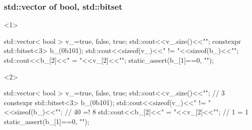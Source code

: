 \documentclass[aspectratio=43]{beamer}
\begin{document}
\begin{frame}[fragile]\frametitle{std::vector of bool, std::bitset}
\begin{onlyenv}<1>
  \begin{Cpplisting}{}
std::vector< bool > v_={true, false, true};
std::cout<<v_.size()<<"\n";
constexpr std::bitset<3> b_(0b101);
std::cout<<sizeof(v_)<<" != "<<sizeof(b_)<<"\n";
std::cout<<b_[2]<<" = "<<v_[2]<<"\n";
static_assert(b_[1]==0, "");
  \end{Cpplisting}
\end{onlyenv}
\begin{onlyenv}<2>
  \begin{Cpplisting}{}
std::vector< bool > v_={true, false, true};
std::cout<<v_.size()<<"\n"; // 3
constexpr std::bitset<3> b_(0b101);
std::cout<<sizeof(v_)<<" != "<<sizeof(b_)<<"\n"; // 40 =! 8
std::cout<<b_[2]<<" = "<<v_[2]<<"\n"; // 1 = 1
static_assert(b_[1]==0, "");
  \end{Cpplisting}
\end{onlyenv}
\end{frame}

\end{document}
